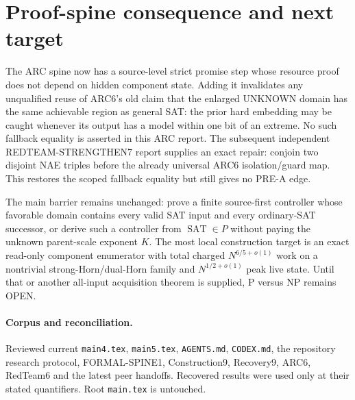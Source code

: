 \documentclass[11pt]{article}
\newcommand{\SAT}{\operatorname{SAT}}
\begin{document}
\section{Proof-spine consequence and next target}

The ARC spine now has a source-level strict promise step whose resource proof
does not depend on hidden component state.  Adding it invalidates any
unqualified reuse of ARC6's old claim that the enlarged UNKNOWN domain has
the same achievable region as general SAT: the prior hard embedding may be
caught whenever its output has a model within one bit of an extreme.  No such
fallback equality is asserted in this ARC report.  The subsequent independent
REDTEAM-STRENGTHEN7 report supplies an exact repair: conjoin two disjoint NAE
triples before the already universal ARC6 isolation/guard map.  This restores
the scoped fallback equality but still gives no PRE-A edge.

The main barrier remains unchanged: prove a finite source-first controller
whose favorable domain contains every valid SAT input and every ordinary-SAT
successor, or derive such a controller from $\SAT\in P$ without paying the
unknown parent-scale exponent $K$.  The most local construction target is an
exact read-only component enumerator with total charged
$N^{6/5+o(1)}$ work on a nontrivial strong-Horn/dual-Horn family and
$N^{1/2+o(1)}$ peak live state.  Until that or another all-input acquisition
theorem is supplied, P versus NP remains OPEN.

\paragraph{Corpus and reconciliation.}
Reviewed current \texttt{main4.tex}, \texttt{main5.tex}, \texttt{AGENTS.md},
\texttt{CODEX.md}, the repository research protocol, FORMAL-SPINE1,
Construction9, Recovery9, ARC6, RedTeam6 and the latest peer handoffs.
Recovered results were used only at their stated quantifiers.  Root
\texttt{main.tex} is untouched.
\end{document}
